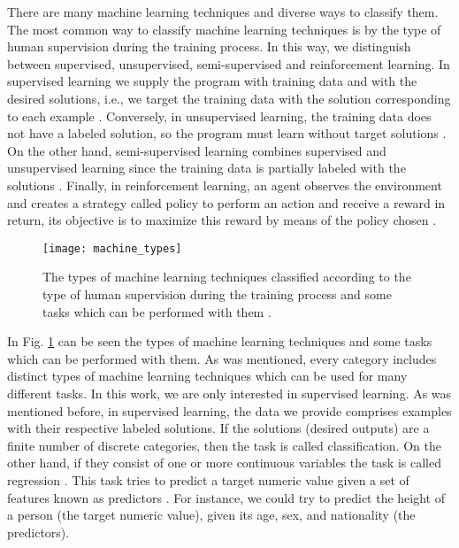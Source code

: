 There are many machine learning techniques and diverse ways to classify them. The most common way to classify machine learning techniques is by the type of human supervision during the training process. In this way, we distinguish between supervised, unsupervised, semi-supervised and reinforcement learning. In supervised learning we supply the program with training data and with the desired solutions, i.e., we target the training data with the solution corresponding to each example \cite{machine_mitchell}. Conversely, in unsupervised learning, the training data does not have a labeled solution, so the program must learn without target solutions \cite{machine_mitchell}. On the other hand, semi-supervised learning combines supervised and unsupervised learning since the training data is partially labeled with the solutions \cite{machine_mitchell}. Finally,  in reinforcement learning, an agent observes the environment and creates a strategy called policy to perform an action and receive a reward in return, its objective is to maximize this reward by means of the policy chosen \cite{machine_mitchell}.\\

\begin{figure}
\centering
\texttt{[image: machine\_types]}
\caption[The types of machine learning techniques classified according to the type of human supervision during the training process and some tasks which can be performed with them.]{The types of machine learning techniques classified according to the type of human supervision during the training process and some tasks which can be performed with them \cite{machine_bishop}.}
\label{fig:machine_types}
\end{figure}

In Fig. \ref{fig:machine_types} can be seen the types of machine learning techniques and some tasks which can be performed with them. As was mentioned, every category includes distinct types of machine learning techniques which can be used for many different tasks. In this work, we are only interested in supervised learning. As was mentioned before, in supervised learning, the data we provide comprises examples with their respective labeled solutions. If the solutions (desired outputs) are a finite number of discrete categories, then the task is called classification. On the other hand, if they consist of one or more continuous variables the task is called regression \cite{machine_bishop}. This task tries to predict a target numeric value given a set of features known as predictors \cite{machine_mitchell}. For instance, we could try to predict the height of a person (the target numeric value), given its age, sex, and nationality (the predictors).\\

